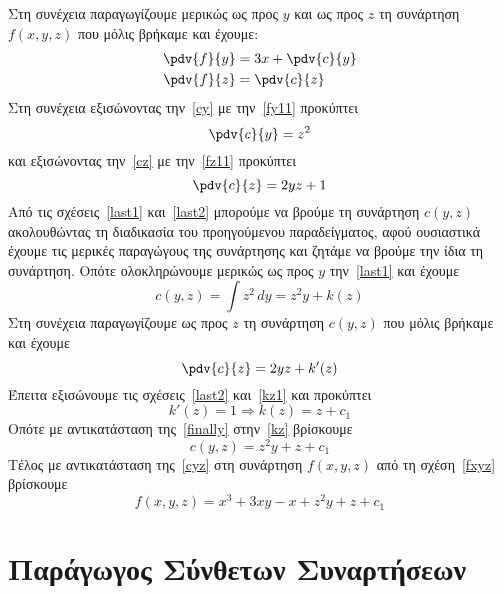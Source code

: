 \begin{solution}
\begin{description}
\begin{equation}
      \end{equation}
      Στη συνέχεια παραγωγίζουμε μερικώς ως προς $y$ και ως προς $z$  
      τη συνάρτηση $f(x,y,z)$ που μόλις βρήκαμε και έχουμε:
      \begin{align}
        \pdv{f}{y} &= 3x + \pdv{c}{y} \label{cy} \\
        \pdv{f}{z} &= \pdv{c}{z} \label{cz}
      \end{align}
      Στη συνέχεια εξισώνοντας την~\eqref{cy} με την~\eqref{fy11} προκύπτει 
      \begin{equation}
        \pdv{c}{y} = z^{2} \label{last1}
      \end{equation}
      και εξισώνοντας την~\eqref{cz} με την~\eqref{fz11} προκύπτει
      \begin{equation}
        \pdv{c}{z} = 2yz+1 \label{last2}
      \end{equation}
      Από τις σχέσεις~\eqref{last1} και~\eqref{last2} μπορούμε να βρούμε τη συνάρτηση 
      $ c(y,z) $ ακολουθώντας τη διαδικασία του προηγούμενου παραδείγματος, αφού 
      ουσιαστικά έχουμε τις μερικές παραγώγους της συνάρτησης και ζητάμε 
      να βρούμε την ίδια τη συνάρτηση. Οπότε ολοκληρώνουμε μερικώς ως προς 
      $y$ την~\eqref{last1} και έχουμε
      \begin{equation}
        c(y,z) = \int z^{2} \,{dy} = z^{2}y + k(z) \label{kz} 
      \end{equation} 
      Στη συνέχεια παραγωγίζουμε ως προς $z$ τη συνάρτηση $ c(y,z) $ που μόλις βρήκαμε 
      και έχουμε
      \begin{equation}
        \pdv{c}{z} = 2yz + k'(z) \label{kz1}
      \end{equation} 
      Έπειτα εξισώνουμε τις σχέσεις~\eqref{last2} και~\eqref{kz1} και προκύπτει 
      \[
        k'(z) = 1 \Rightarrow k(z) = z + c_{1} \label{finally}
      \] 
      Οπότε με αντικατάσταση της~\eqref{finally} στην~\eqref{kz} βρίσκουμε 
      \begin{equation}
        c(y,z) = z^{2}y+z + c_{1} \label{cyz}
      \end{equation}
      Τέλος με αντικατάσταση της~\eqref{cyz} στη συνάρτηση $ f(x,y,z) $ από τη 
      σχέση~\eqref{fxyz} βρίσκουμε
      \[
        f(x,y,z) = x^{3}+3xy-x+z^{2}y+z+ c_{1} 
      \] 
  \end{description}
\end{solution}

\chapter{Παράγωγος Σύνθετων Συναρτήσεων}

